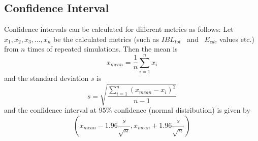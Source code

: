 \documentclass[3p, twocolumn]{elsarticle}
\begin{document}
\subsection {Confidence Interval}
Confidence intervals can be calculated for different metrics as follows: Let $x_1, x_2, x_3,..., x_n$ be the calculated metrics (such as $IBL_{tot}$ ~and~ $E_{cdc}$ values etc.) from $n$ times of repeated simulations. Then the mean is
\begin{equation}
x_{mean}=\frac{1}{n}\sum_{i=1}^{n} x_i
\end{equation}
and the standard deviation $s$ is
\begin{equation}
s=\sqrt{\frac{\sum_{i=1}^{n} (x_{mean}-x_i)^2}{n-1}}
\end{equation}
and the confidence interval at 95$\%$ confidence (normal distribution) is given by
\begin{equation}
(x_{mean}-1.96\frac{s}{\sqrt{n}}, x_{mean}+1.96\frac{s}{\sqrt{n}})
\end{equation}
\end{document}
